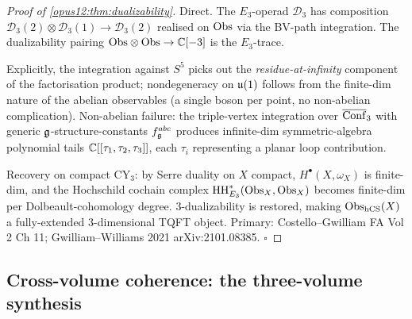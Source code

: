 \begin{proof}[Proof of \ref{opus12:thm:dualizability}]
Direct. The $E_3$-operad $\mathcal D_3$ has composition
$\mathcal D_3(2) \otimes \mathcal D_3(1) \to \mathcal D_3(2)$ realised
on $\mathrm{Obs}$ via the BV-path integration. The dualizability pairing
$\mathrm{Obs} \otimes \mathrm{Obs} \to \mathbb{C}[-3]$ is the $E_3$-trace.

Explicitly, the integration against $S^5$ picks out the
\emph{residue-at-infinity} component of the factorisation product;
nondegeneracy on $\mathfrak{u}(1)$ follows from the finite-dim nature of the
abelian observables (a single boson per point, no non-abelian
complication). Non-abelian failure: the triple-vertex integration
over $\overline{\mathrm{Conf}}_3$ with generic $\mathfrak{g}$-structure-constants
$f^{abc}_{\mathfrak{g}}$ produces infinite-dim symmetric-algebra polynomial
tails $\mathbb{C}[[\tau_1, \tau_2, \tau_3]]$, each $\tau_i$ representing a
planar loop contribution.

Recovery on compact CY$_3$: by Serre duality on $X$ compact,
$H^\bullet(X, \omega_X)$ is finite-dim, and the Hochschild cochain
complex $\mathrm{HH}^*_{E_3}(\mathrm{Obs}_X, \mathrm{Obs}_X)$ becomes finite-dim per
Dolbeault-cohomology degree. 3-dualizability is restored, making
$\mathrm{Obs}_{\mathrm{hCS}}(X)$ a fully-extended 3-dimensional TQFT object.
Primary: Costello--Gwilliam FA Vol 2 Ch 11; Gwilliam--Williams 2021
arXiv:2101.08385. $\square$
\end{proof}

\subsection{Cross-volume coherence: the three-volume synthesis}
\label{opus12:sec:cross-volume}

